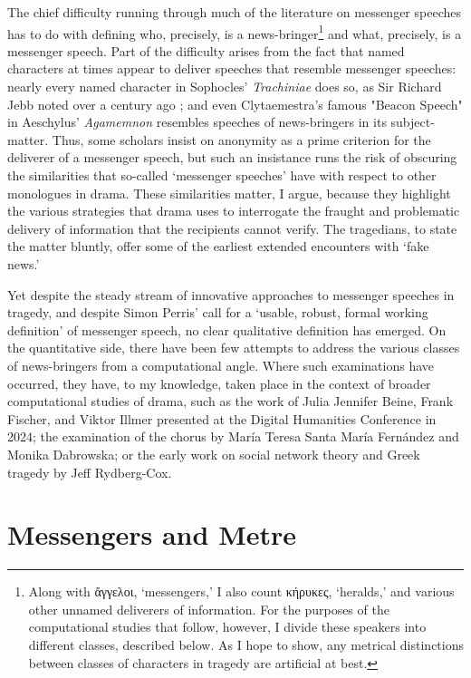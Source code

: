 \documentclass[
]{ceurart}
\begin{document}
The chief difficulty running through much of the literature on messenger
speeches has to do with defining who, precisely, is a news-bringer\footnote
{Along with ἄγγελοι, `messengers,' I also count κήρυκες, `heralds,' and
various other unnamed deliverers of information. For the purposes of the
computational studies that follow, however, I divide these speakers into
different classes, described below. As I hope to show, any metrical
distinctions between classes of characters in tragedy are artificial at
best.} and what, precisely, is a messenger speech. Part of the difficulty
arises from the fact that named characters at times appear to deliver
speeches that resemble messenger speeches: nearly every named character in
Sophocles'
\textit{Trachiniae} does so, as Sir Richard Jebb noted over a century ago
\cite{Jebb1902}; and even Clytaemestra's famous "Beacon Speech" in Aeschylus'
\textit{Agamemnon} resembles speeches of news-bringers in its
subject-matter. Thus, some scholars insist on anonymity as a prime criterion
for the deliverer of a messenger speech, but such an insistance runs the risk
of obscuring the similarities that so-called `messenger speeches' have with
respect to other monologues in drama. These similarities matter, I argue,
because they highlight the various strategies that drama uses to interrogate
the fraught and problematic delivery of information that the recipients cannot
verify. The tragedians, to state the matter bluntly, offer some of the earliest
extended encounters with `fake news.'

Yet despite the steady stream of innovative approaches to messenger speeches
in tragedy, and despite Simon Perris' call for a `usable, robust, formal
working definition' of messenger speech, no clear qualitative definition has
emerged.\cite{Perris2011} On the quantitative side, there have been few
attempts to address the various classes of news-bringers from a computational
angle. Where such examinations have occurred, they have, to my knowledge,
taken place in the context of broader computational studies of drama, such as
the work of Julia Jennifer Beine, Frank Fischer, and Viktor Illmer presented
at the Digital Humanities Conference in 2024; the examination of the chorus
by María Teresa Santa María Fernández and Monika Dabrowska; or the early work
on social network theory and Greek tragedy by Jeff Rydberg-Cox.\cite
{Beine.etal2024, Fernandez.Dabrowska2023, Rydberg-Cox2011}

\section{Messengers and Metre}
\end{document}
